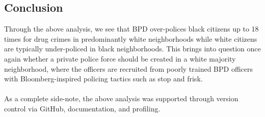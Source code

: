 \documentclass[10pt]{article}
\begin{document}
\subsection*{Conclusion}
 Through the above analysis, we see that BPD over-polices black citizens up to 18 times for drug crimes in predominantly white neighborhoods while white citizens are typically under-policed in black neighborhoods. This brings into question once again whether a private police force should be created in a white majority neighborhood, where the officers are recruited from poorly trained BPD officers with Bloomberg-inspired policing tactics such as stop and frisk. \\
 \\
 As a complete side-note, the above analysis was supported through version control via GitHub, documentation, and profiling.

 
\end{document}
